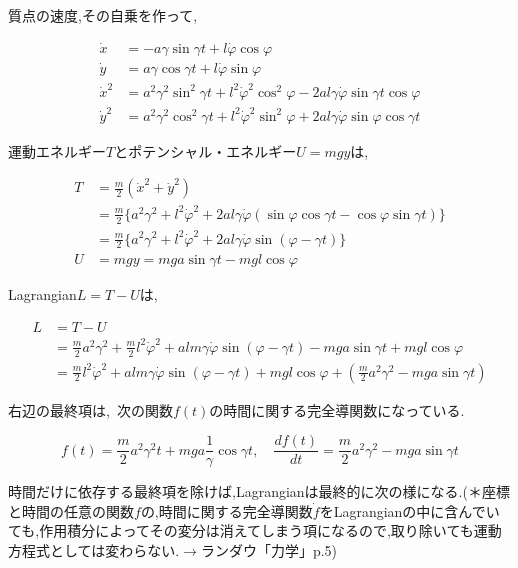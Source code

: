 質点の速度,その自乗を作って,

\begin{align*}
   \dot{x}&=-a\gamma\sin\gamma t + l\dot{\varphi}\cos\varphi\\
   \dot{y}&=a\gamma\cos\gamma t + l\dot{\varphi}\sin\varphi\\
   \dot{x}^2&=a^2\gamma^2\sin^2\gamma t + l^2\dot{\varphi}^2\cos^2\varphi - 2al\gamma\dot{\varphi}\sin\gamma t\cos\varphi\\
   \dot{y}^2&=a^2\gamma^2\cos^2\gamma t + l^2\dot{\varphi}^2\sin^2\varphi + 2al\gamma\dot{\varphi}\sin\varphi\cos\gamma t
\end{align*}

運動エネルギー$T$とポテンシャル・エネルギー$U=mgy$は,

\begin{align*}
   T&=\displaystyle\frac{m}{2}\left(\dot{x}^2+\dot{y}^2\right)\\
   &=\frac{m}{2}\{a^2\gamma^2 + l^2\dot{\varphi}^2 + 2al\gamma\dot{\varphi}\left(\sin\varphi\cos\gamma t - \cos\varphi\sin\gamma t\right)\}\\
   &=\frac{m}{2}\{a^2\gamma^2 + l^2\dot{\varphi}^2 + 2al\gamma\dot{\varphi}\sin(\varphi-\gamma t)\}\\
   U&=mgy=mga\sin\gamma t - mgl\cos\varphi
\end{align*}

Lagrangian$L=T-U$は,

\begin{align*}
   L&=T-U\\
   &=\displaystyle\frac{m}{2}a^2\gamma^2 + \frac{m}{2}l^2\dot{\varphi}^2 + alm\gamma\dot{\varphi}\sin(\varphi-\gamma t) - mga\sin\gamma t + mgl\cos\varphi\\
   &=\frac{m}{2}l^2\dot{\varphi}^2 + alm\gamma\dot{\varphi}\sin(\varphi-\gamma t) + mgl\cos\varphi +\left(\frac{m}{2}a^2\gamma^2 - mga\sin\gamma t\right)
\end{align*}

右辺の最終項は, 次の関数$f(t)$の時間に関する完全導関数になっている.

\[f(t)=\displaystyle\frac{m}{2}a^2\gamma^2t + mga\frac{1}{\gamma}\cos\gamma t,\quad\frac{df(t)}{dt}=\frac{m}{2}a^2\gamma^2-mga\sin\gamma t\]

時間だけに依存する最終項を除けば,Lagrangianは最終的に次の様になる.(＊座標と時間の任意の関数$f$の,時間に関する完全導関数$\dot{f}$をLagrangianの中に含んでいても,作用積分によってその変分は消えてしまう項になるので,取り除いても運動方程式としては変わらない.$\rightarrow$ランダウ「力学」p.5)

